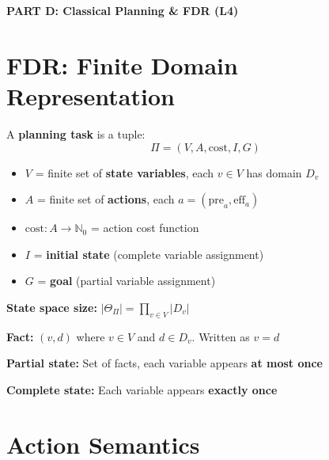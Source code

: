 \documentclass[11pt,a4paper]{article}
\begin{document}
\newpage
\begin{center}
\textbf{\LARGE PART D: Classical Planning \& FDR (L4)}
\end{center}
\vspace{1em}

\renewcommand{\thesection}{D.\arabic{section}}

\section{FDR: Finite Domain Representation}

\begin{definitionbox}
A \textbf{planning task} is a tuple:
\[\Pi = (V, A, \text{cost}, I, G)\]
\begin{itemize}[leftmargin=*,nosep]
\item $V$ = finite set of \textbf{state variables}, each $v \in V$ has domain $D_v$
\item $A$ = finite set of \textbf{actions}, each $a = (\text{pre}_a, \text{eff}_a)$
\item $\text{cost}: A \to \mathbb{N}_0$ = action cost function
\item $I$ = \textbf{initial state} (complete variable assignment)
\item $G$ = \textbf{goal} (partial variable assignment)
\end{itemize}

\textbf{State space size:} $|\Theta_\Pi| = \prod_{v \in V} |D_v|$
\end{definitionbox}

\begin{definitionbox}
\textbf{Fact:} $(v, d)$ where $v \in V$ and $d \in D_v$. Written as $v{=}d$

\textbf{Partial state:} Set of facts, each variable appears \textbf{at most once}

\textbf{Complete state:} Each variable appears \textbf{exactly once}
\end{definitionbox}

\section{Action Semantics}
\end{document}
